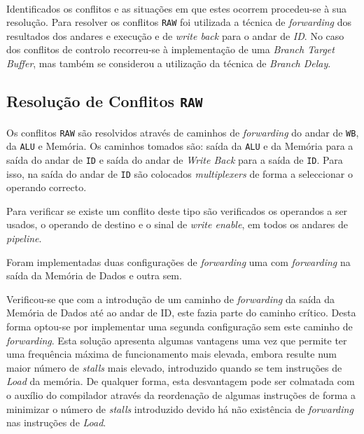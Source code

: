 \paragraph{} Identificados os conflitos e as situações em que estes ocorrem procedeu-se à sua resolução. Para resolver os conflitos \texttt{RAW} foi utilizada a técnica de \textit{forwarding} dos resultados dos andares e execução e de \textit{write back} para o andar de \textit{ID}. No caso dos conflitos de controlo recorreu-se à implementação de uma \textit{Branch Target Buffer}, mas também se considerou a utilização da técnica de \textit{Branch Delay}.

\subsection{Resolução de Conflitos \texttt{RAW}}

\paragraph{} Os conflitos \texttt{RAW} são resolvidos através de caminhos de \textit{forwarding} do andar de \texttt{WB}, da \texttt{ALU} e Memória. Os caminhos tomados são: saída da \texttt{ALU} e da Memória para a saída do andar de \texttt{ID} e saída do andar de \textit{Write Back} para a saída de \texttt{ID}.
Para isso, na saída do andar de \texttt{ID} são colocados \textit{multiplexers} de forma a seleccionar o operando correcto.

Para verificar se existe um conflito deste tipo são verificados os operandos a ser usados, o operando de destino e o sinal de \textit{write enable}, em todos os andares de \textit{pipeline}.

Foram implementadas duas configurações de \textit{forwarding} uma com \textit{forwarding} na saída da Memória de Dados e outra sem. 

Verificou-se que com a introdução de um caminho de \textit{forwarding} da saída da Memória de Dados até ao andar de ID, este fazia parte do caminho crítico. Desta forma optou-se por implementar uma segunda configuração sem este caminho de \textit{forwarding}. Esta solução apresenta algumas vantagens uma vez que permite ter uma frequência máxima de funcionamento mais elevada, embora resulte num maior número de \textit{stalls} mais elevado, introduzido quando se tem instruções de \textit{Load} da memória. De qualquer forma, esta desvantagem pode ser colmatada com o auxílio do compilador através da reordenação de algumas instruções de forma a minimizar o número de \textit{stalls} introduzido devido há não existência de \textit{forwarding} nas instruções de \textit{Load}.

